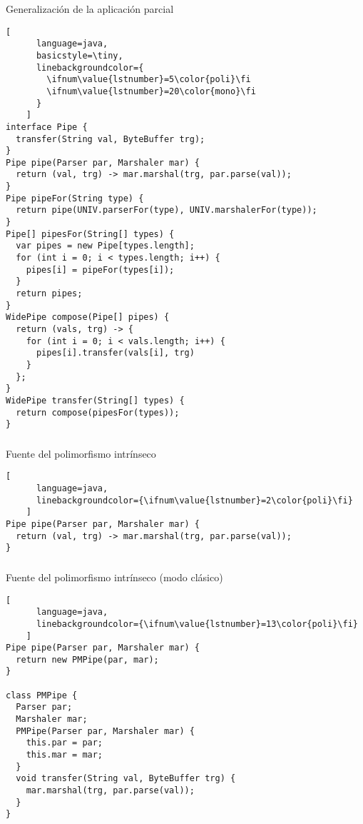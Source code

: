 \begin{frame}[fragile]
  \begin{block}{Generalización de la aplicación parcial}
    \begin{lstlisting}[
      language=java,
      basicstyle=\tiny,
      linebackgroundcolor={
        \ifnum\value{lstnumber}=5\color{poli}\fi
        \ifnum\value{lstnumber}=20\color{mono}\fi
      }
    ]
interface Pipe {
  transfer(String val, ByteBuffer trg);
}
Pipe pipe(Parser par, Marshaler mar) {
  return (val, trg) -> mar.marshal(trg, par.parse(val));
}
Pipe pipeFor(String type) {
  return pipe(UNIV.parserFor(type), UNIV.marshalerFor(type));
}
Pipe[] pipesFor(String[] types) {
  var pipes = new Pipe[types.length];
  for (int i = 0; i < types.length; i++) {
    pipes[i] = pipeFor(types[i]);
  }
  return pipes;
}
WidePipe compose(Pipe[] pipes) {
  return (vals, trg) -> {
    for (int i = 0; i < vals.length; i++) {
      pipes[i].transfer(vals[i], trg)
    }
  };
}
WidePipe transfer(String[] types) {
  return compose(pipesFor(types));
}
    \end{lstlisting}
  \end{block}
\end{frame}


\begin{frame}[fragile]
  \frametitle{\ft}
  \begin{block}{Fuente del polimorfismo intrínseco}
    \begin{lstlisting}[
      language=java,
      linebackgroundcolor={\ifnum\value{lstnumber}=2\color{poli}\fi}
    ]
Pipe pipe(Parser par, Marshaler mar) {
  return (val, trg) -> mar.marshal(trg, par.parse(val));
}
    \end{lstlisting}
  \end{block}
\end{frame}


\begin{frame}[fragile]
  \frametitle{\ft}
  \begin{block}{Fuente del polimorfismo intrínseco (modo clásico)}
    \begin{lstlisting}[
      language=java,
      linebackgroundcolor={\ifnum\value{lstnumber}=13\color{poli}\fi}
    ]
Pipe pipe(Parser par, Marshaler mar) {
  return new PMPipe(par, mar);
}

class PMPipe {
  Parser par;
  Marshaler mar;
  PMPipe(Parser par, Marshaler mar) {
    this.par = par;
    this.mar = mar;
  }
  void transfer(String val, ByteBuffer trg) {
    mar.marshal(trg, par.parse(val));
  }
}
    \end{lstlisting}
  \end{block}
\end{frame}


